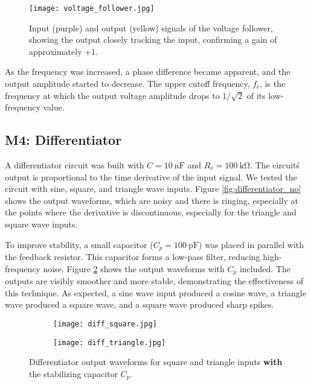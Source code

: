 \documentclass[12pt,a4paper]{article}
\begin{document}
\begin{figure}[H]
    \centering
    \texttt{[image: voltage\_follower.jpg]} %
    \caption{Input (purple) and output (yellow) signals of the voltage follower, showing the output closely tracking the input, confirming a gain of approximately +1.}
    \label{fig:follower_unity}
\end{figure}

As the frequency was increased, a phase difference became apparent, and the output amplitude started to decrease. The upper cutoff frequency, \(f_c\), is the frequency at which the output voltage amplitude drops to \(1/\sqrt{2}\) of its low-frequency value.


\subsection{M4: Differentiator}
A differentiator circuit was built with \(C = \SI{10}{\nano\farad}\) and \(R_v = \SI{100}{\kilo\ohm}\). The circuit\'s output is proportional to the time derivative of the input signal. We tested the circuit with sine, square, and triangle wave inputs. Figure \ref{fig:differentiator_no} shows the output waveforms, which are noisy and there is ringing, especially at the points where the derivative is discontinuous, especially for the triangle and square wave inputs. 

To improve stability, a small capacitor (\(C_p = \SI{100}{\pico\farad}\)) was placed in parallel with the feedback resistor. This capacitor forms a low-pass filter, reducing high-frequency noise. Figure \ref{fig:differentiator} shows the output waveforms with \(C_p\) included. The outputs are visibly smoother and more stable, demonstrating the effectiveness of this technique. As expected, a sine wave input produced a cosine wave, a triangle wave produced a square wave, and a square wave produced sharp spikes.

\begin{figure}[H]
    \centering
    \begin{subfigure}[b]{0.32\linewidth}
        \texttt{[image: diff\_square.jpg]} %
    \end{subfigure}
    \begin{subfigure}[b]{0.32\linewidth}
        \texttt{[image: diff\_triangle.jpg]} %
    \end{subfigure}
    \caption{Differentiator output waveforms for square and triangle inputs \textbf{with} the stabilizing capacitor \(C_p\).}
    \label{fig:differentiator}
\end{figure}
\end{document}
